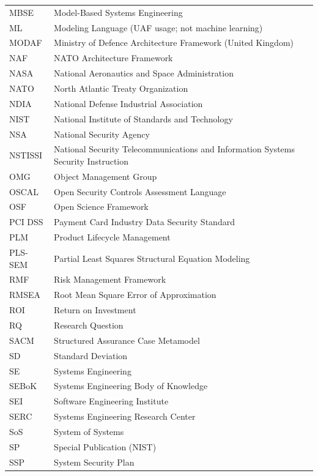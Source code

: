 \begin{singlespace}
\begin{longtable}{p{} p{}}
MBSE      & Model-Based Systems Engineering \\
ML        & Modeling Language (UAF usage; not machine learning) \\
MODAF     & Ministry of Defence Architecture Framework (United Kingdom) \\
NAF       & NATO Architecture Framework \\
NASA      & National Aeronautics and Space Administration \\
NATO      & North Atlantic Treaty Organization \\
NDIA      & National Defense Industrial Association \\
NIST      & National Institute of Standards and Technology \\
NSA       & National Security Agency \\
NSTISSI   & National Security Telecommunications and Information Systems Security Instruction \\
OMG       & Object Management Group \\
OSCAL     & Open Security Controls Assessment Language \\
OSF       & Open Science Framework \\
PCI DSS   & Payment Card Industry Data Security Standard \\
PLM       & Product Lifecycle Management \\
PLS-SEM   & Partial Least Squares Structural Equation Modeling \\
RMF       & Risk Management Framework \\
RMSEA     & Root Mean Square Error of Approximation \\
ROI       & Return on Investment \\
RQ        & Research Question \\
SACM      & Structured Assurance Case Metamodel \\
SD        & Standard Deviation \\
SE        & Systems Engineering \\
SEBoK     & Systems Engineering Body of Knowledge \\
SEI       & Software Engineering Institute \\
SERC      & Systems Engineering Research Center \\
SoS       & System of Systems \\
SP        & Special Publication (NIST) \\
SSP       & System Security Plan \\

\end{longtable}
\end{singlespace}
